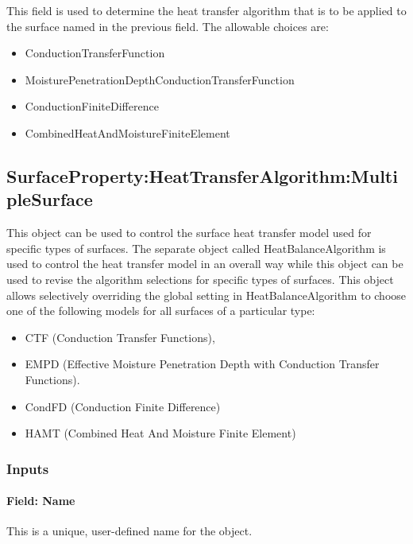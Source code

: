This field is used to determine the heat transfer algorithm that is to be applied to the surface named in the previous field. The allowable choices are:

\begin{itemize}
\item
  ConductionTransferFunction
\item
  MoisturePenetrationDepthConductionTransferFunction
\item
  ConductionFiniteDifference
\item
  CombinedHeatAndMoistureFiniteElement
\end{itemize}

\subsection{SurfaceProperty:HeatTransferAlgorithm:MultipleSurface}\label{surfacepropertyheattransferalgorithmmultiplesurface}

This object can be used to control the surface heat transfer model used for specific types of surfaces. The separate object called HeatBalanceAlgorithm is used to control the heat transfer model in an overall way while this object can be used to revise the algorithm selections for specific types of surfaces. This object allows selectively overriding the global setting in HeatBalanceAlgorithm to choose one of the following models for all surfaces of a particular type:

\begin{itemize}
\item
  CTF (Conduction Transfer Functions),
\item
  EMPD (Effective Moisture Penetration Depth with Conduction Transfer Functions).
\item
  CondFD (Conduction Finite Difference)
\item
  HAMT (Combined Heat And Moisture Finite Element)
\end{itemize}

\subsubsection{Inputs}\label{inputs-1-000}

\paragraph{Field: Name}\label{field-name-000}

This is a unique, user-defined name for the object.


